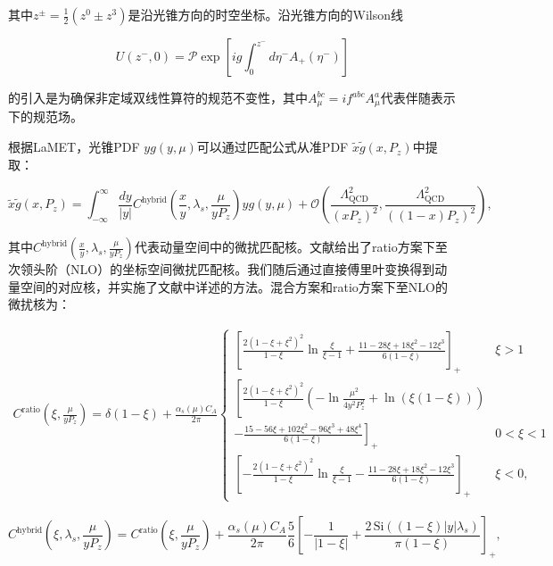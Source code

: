 \documentclass[12pt,a4paper]{ctexart}
\begin{document}
其中$z^\pm = \frac{1}{2}(z^0 \pm z^3)$是沿光锥方向的时空坐标。沿光锥方向的Wilson线

\begin{equation}
U(z^-,0) = \mathcal{P} \exp\left[ ig \int_0^{z^-} d\eta^- A_+(\eta^-) \right]
\label{eq:wilson_adj}
\end{equation}

的引入是为确保非定域双线性算符的规范不变性，其中$A^{bc}_\mu = if^{abc}A^a_\mu$代表伴随表示下的规范场。

根据LaMET，光锥PDF $y g(y, \mu)$可以通过匹配公式从准PDF $\tilde{x}\tilde{g}(x, P_z)$中提取：

\begin{equation}
\tilde{x}\tilde{g}(x, P_z) = \int_{-\infty}^{\infty} \frac{dy}{|y|} C^{\text{hybrid}}\left(\frac{x}{y}, \lambda_s, \frac{\mu}{yP_z}\right) y g(y, \mu) + \mathcal{O}\left(\frac{\Lambda^2_{\text{QCD}}}{(xP_z)^2}, \frac{\Lambda^2_{\text{QCD}}}{((1-x)P_z)^2}\right),
\label{eq:matching}
\end{equation}

其中$C^{\text{hybrid}}\left(\frac{x}{y}, \lambda_s, \frac{\mu}{yP_z}\right)$代表动量空间中的微扰匹配核。文献\cite{Balitsky2020,Balitsky2022}给出了ratio方案下至次领头阶（NLO）的坐标空间微扰匹配核。我们随后通过直接傅里叶变换得到动量空间的对应核，并实施了文献\cite{Yao2023}中详述的方法。混合方案和ratio方案下至NLO的微扰核为：

\begin{equation}
\begin{aligned}
C^{\text{ratio}}\left(\xi, \frac{\mu}{yP_z}\right) = \delta(1-\xi) + \frac{\alpha_s(\mu)C_A}{2\pi}
\begin{cases}
\left[\frac{2(1-\xi+\xi^2)^2}{1-\xi}\ln\frac{\xi}{\xi-1} + \frac{11-28\xi+18\xi^2-12\xi^3}{6(1-\xi)}\right]_+ & \xi > 1 \\[10pt]
\left[\frac{2(1-\xi+\xi^2)^2}{1-\xi}\left(-\ln\frac{\mu^2}{4y^2P_z^2} + \ln(\xi(1-\xi))\right) \right. \\
\left. -\frac{15-56\xi+102\xi^2-96\xi^3+48\xi^4}{6(1-\xi)}\right]_+ & 0 < \xi < 1 \\[10pt]
\left[-\frac{2(1-\xi+\xi^2)^2}{1-\xi}\ln\frac{\xi}{\xi-1} - \frac{11-28\xi+18\xi^2-12\xi^3}{6(1-\xi)}\right]_+ & \xi < 0,
\end{cases}
\end{aligned}
\label{eq:Cratio}
\end{equation}

\begin{equation}
C^{\text{hybrid}}\left(\xi, \lambda_s, \frac{\mu}{yP_z}\right) = C^{\text{ratio}}\left(\xi, \frac{\mu}{yP_z}\right) + \frac{\alpha_s(\mu)C_A}{2\pi} \frac{5}{6}\left[-\frac{1}{|1-\xi|} + \frac{2\,\text{Si}((1-\xi)|y|\lambda_s)}{\pi(1-\xi)}\right]_+,
\label{eq:Chybrid}
\end{equation}
\end{document}

